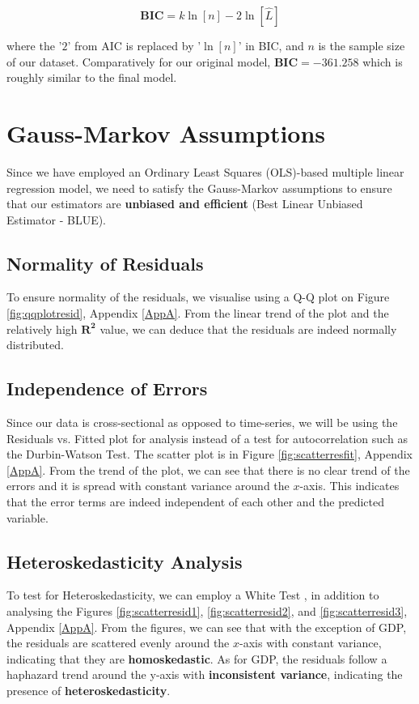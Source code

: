 \documentclass{article}
\begin{document}
\begin{equation}
    \textbf{BIC} = k\ln{[n]} - 2\ln{[\hat{L}]}
\end{equation}

\noindent where the '$2$' from AIC is replaced by '$\ln{[n]}$' in BIC, and $n$ is the sample size of our dataset. Comparatively for our original model, $\textbf{BIC} \bm{= -361.258}$ which is roughly similar to the final model.  

\section{Gauss-Markov Assumptions}
Since we have employed an Ordinary Least Squares (OLS)-based multiple linear regression model, we need to satisfy the Gauss-Markov assumptions \cite{GaussMarkov} to ensure that our estimators are \textbf{unbiased and efficient} (Best Linear Unbiased Estimator - BLUE).

\subsection{Normality of Residuals}
To ensure normality of the residuals, we visualise using a Q-Q plot on Figure \ref{fig:qqplotresid}, Appendix \ref{AppA}. From the linear trend of the plot and the relatively high $\bm{R^2}$ value, we can deduce that the residuals are indeed normally distributed.

\subsection{Independence of Errors}
Since our data is cross-sectional as opposed to time-series, we will be using the Residuals vs. Fitted plot for analysis instead of a test for autocorrelation such as the Durbin-Watson Test. The scatter plot is in Figure \ref{fig:scatterresfit}, Appendix \ref{AppA}. From the trend of the plot, we can see that there is no clear trend of the errors and it is spread with constant variance around the $x$-axis. This indicates that the error terms are indeed independent of each other and the predicted variable.

\subsection{Heteroskedasticity Analysis}\label{Hetero}
To test for Heteroskedasticity, we can employ a White Test \cite{heteroskedasticity}, in addition to analysing the Figures \ref{fig:scatterresid1}, \ref{fig:scatterresid2}, and \ref{fig:scatterresid3}, Appendix \ref{AppA}. From the figures, we can see that with the exception of GDP, the residuals are scattered evenly around the $x$-axis with constant variance, indicating that they are \textbf{homoskedastic}. As for GDP, the residuals follow a haphazard trend around the y-axis with \textbf{inconsistent variance}, indicating the presence of \textbf{heteroskedasticity}. 
\end{document}
